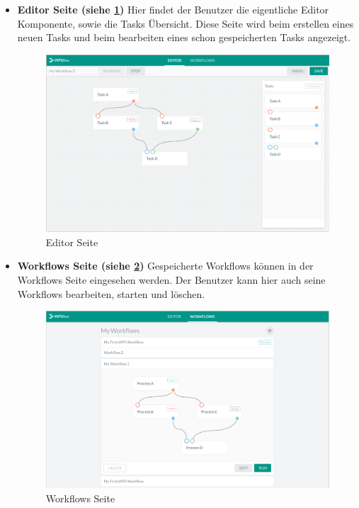         \begin{itemize}
        
        \item \textbf{Editor Seite (siehe \ref{fig:Editor_Page})} \newline
        Hier findet der Benutzer die eigentliche Editor Komponente, sowie die Tasks Übersicht. Diese Seite wird beim erstellen eines neuen Tasks und beim bearbeiten eines schon gespeicherten Tasks angezeigt.
        
        \begin{figure}[h]
        \centering
        \includegraphics[width=\textwidth]{images/ui_page_editor.png}
        \caption{Editor Seite}
        \label{fig:Editor_Page}
        \end{figure}
        
        \item \textbf{Workflows Seite (siehe \ref{fig:Workflow_Page})} \newline
        Gespeicherte Workflows können in der Workflows Seite eingesehen werden. Der Benutzer kann hier auch seine Workflows bearbeiten, starten und löschen.
        
        \begin{figure}[h]
        \centering
        \includegraphics[width=\textwidth]{images/ui_page_flow.png}
        \caption{Workflows Seite}
        \label{fig:Workflow_Page}
        \end{figure}
        
        \end{itemize}
